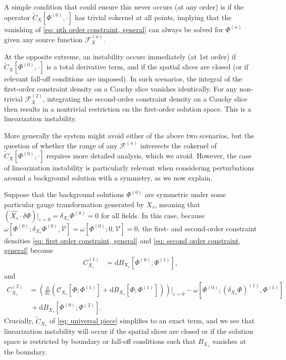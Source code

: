 \documentclass[]{jkpaper}
\theoremstyle{plain}
\theoremstyle{definition}
\newcommand{\fins}{\cdot}
\newcommand{\sd}{\mathrm {d}}
\def\extd{\mathrm {d}}
\begin{document}
A simple condition that could ensure this never occurs (at any order) is if the operator $\tilde{C}_X[\Phi^{(0)}, \cdot]$ has trivial cokernel at all points, implying that the vanishing of \eqref{eq: nth order constraint, general} can always be solved for $\Phi^{(n)}$ given any source function $\mathcal{F}_X^{(n)}$.

At the opposite extreme, an instability occurs immediately (at 1st order) if 
$\tilde{C}_X[\Phi^{(0)}, \cdot]$ is a total derivative term, and if the spatial slices are closed (or if relevant fall-off conditions are imposed).  In such scenarios, the integral of the first-order constraint density on a Cauchy slice vanishes identically.  For any non-trivial $\mathcal{F}_X^{(2)}$, integrating the second-order constraint density on a Cauchy slice then results in a nontrivial restriction on the first-order solution space.  This is a linearization instability.

More generally the system might avoid either of the above two scenarios, but the question of whether the range of any $\mathcal{F}^{(n)}$ intersects the cokernel of $\tilde{C}_X[\Phi^{(0)}, \cdot]$ requires more detailed analysis, which we avoid.  However, the case of linearization instability is particularly relevant when considering perturbations around a background solution with a symmetry, as we now explain.

Suppose that the background solutions $\Phi^{(0)}$ are symmetric under some particular gauge transformation generated by $X_s$, meaning that $(\hat{X_s}\fins \delta\Phi)|_{\varepsilon=0}=\delta_{X_s}\Phi^{(0)}=0$ for all fields.   In this case, because $\omega[\Phi^{(0)};\delta_{X_s}\Phi^{(0)},\mathcal{V}]=\omega[\Phi^{(0)};0,\mathcal{V}]=0$, the first- and second-order constraint densities \eqref{eq: first order constraint, general} and \eqref{eq: second order constraint, general} become
\begin{align}
\label{eq: first order constraint, general symmetry}
     C_{X_s}^{(1)}&=\sd B_{X_s}\left[\Phi^{(0)}; \Phi^{(1)}\right],
\end{align}
and
\begin{align}
\label{eq: second order constraint, general symmetry}
     C_{X_s}^{(2)}&=
      \left(\frac{\extd}{\extd\varepsilon}\left(\mathcal{C}_{X_s}\left[\Phi;\Phi^{(1)}\right]
      +\sd B_{X_s}\left[\Phi;\Phi^{(1)}\right]
      \right)\right)\bigg|_{\varepsilon=0}
      -\omega\left[\Phi^{(0)};(\delta_{X_s}\Phi)^{(1)},\Phi^{(1)}\right]\\ \nonumber
      &~ +\sd B_{X_s}\left[\Phi^{(0)};\Phi^{(2)}\right].
\end{align}
Crucially, $\tilde{C}_{X_s}$ of \eqref{eq: universal piece} simplifies to an exact term, and we see that linearization instability will occur if the spatial slices are closed or if the solution space is restricted by boundary or fall-off conditions such that $B_{X_s}$ vanishes at the boundary.
\end{document}
